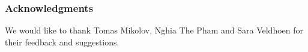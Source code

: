 \documentclass{article} %
\begin{document}








\subsubsection*{Acknowledgments}
We would like to thank Tomas Mikolov, Nghia The Pham and Sara Veldhoen for their feedback and suggestions.



\end{document}
